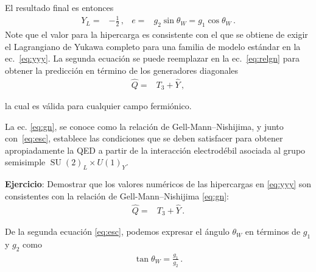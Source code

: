 \begin{frame}
El resultado final es entonces
\begin{align}
\label{eq:esc}
 Y_L=&-\frac{1}{2}\,,&   e=&g_2\sin\theta_W=g_1 \cos\theta_W\,.
\end{align}
Note que el valor para la hipercarga es consistente con el que se obtiene de exigir el Lagrangiano de Yukawa completo para una familia de modelo estándar en la ec.~\eqref{eq:yyy}.
La segunda ecuación se puede reemplazar en la ec.~\eqref{eq:relgn} para obtener la predicción en término de los generadores diagonales
\begin{align}
\label{eq:gn}
 \widehat{Q}=&T_3+\widehat{Y}\,,
\end{align}
\end{frame}
la cual es válida para cualquier campo fermiónico.

La ec. \eqref{eq:gn}, se conoce como la relación de Gell-Mann--Nishijima, y junto con~\eqref{eq:esc}, establece las condiciones que se deben satisfacer para obtener apropiadamente la QED a partir de la interacción electrodébil asociada al grupo semisimple $\operatorname{SU}(2)_L\times  U(1)_Y$.

\noindent
\textbf{Ejercicio}: Demostrar que los valores numéricos de las hipercargas en \eqref{eq:yyy} son consistentes con la relación de Gell-Mann--Nishijima \eqref{eq:gn}:
\begin{align}
 \widehat{Q}=&T_3+\widehat{Y}\,.
\end{align}


De la segunda ecuación  \eqref{eq:esc}, podemos expresar el ángulo $\theta_W$ en términos de $g_1$ y $g_2$ como
\begin{align}
\label{eq:twa}
  \tan\theta_W=\frac{g_1}{g_2}\,.
\end{align}

